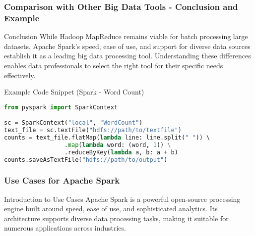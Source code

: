\documentclass[aspectratio=169]{beamer}
\begin{document}
\begin{frame}[fragile]
    \frametitle{Comparison with Other Big Data Tools - Conclusion and Example}
    \begin{block}{Conclusion}
        While Hadoop MapReduce remains viable for batch processing large datasets, Apache Spark's speed, ease of use, and support for diverse data sources establish it as a leading big data processing tool. Understanding these differences enables data professionals to select the right tool for their specific needs effectively.
    \end{block}
    
    \begin{block}{Example Code Snippet (Spark - Word Count)}
        \begin{lstlisting}[language=Python]
from pyspark import SparkContext

sc = SparkContext("local", "WordCount")
text_file = sc.textFile("hdfs://path/to/textfile")
counts = text_file.flatMap(lambda line: line.split(" ")) \ 
                 .map(lambda word: (word, 1)) \
                 .reduceByKey(lambda a, b: a + b)
counts.saveAsTextFile("hdfs://path/to/output")
        \end{lstlisting}
    \end{block}
\end{frame}

\begin{frame}
    \frametitle{Use Cases for Apache Spark}
    \begin{block}{Introduction to Use Cases}
        Apache Spark is a powerful open-source processing engine built around speed, ease of use, and sophisticated analytics. Its architecture supports diverse data processing tasks, making it suitable for numerous applications across industries.
    \end{block}
\end{frame}
\end{document}
